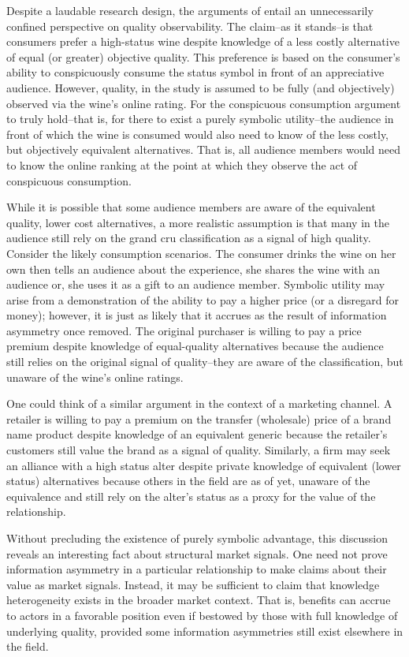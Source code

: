 Despite a laudable research design, the arguments of \citet{malter2014} entail an unnecessarily confined perspective on quality observability. The claim--as it stands--is that consumers prefer a high-status wine despite knowledge of a less costly alternative of equal (or greater) objective quality. This preference is based on the consumer's ability to conspicuously consume the status symbol in front of an appreciative audience. However, quality, in the \citet{malter2014} study is assumed to be fully (and objectively) observed via the wine's online rating. For the conspicuous consumption argument to truly hold--that is, for there to exist a purely symbolic utility--the audience in front of which the wine is consumed would also need to know of the less costly, but objectively equivalent alternatives. That is, all audience members would need to know the online ranking at the point at which they observe the act of conspicuous consumption.

While it is possible that some audience members are aware of the equivalent quality, lower cost alternatives, a more realistic assumption is that many in the audience still rely on the grand cru classification as a signal of high quality. Consider the likely consumption scenarios. The consumer drinks the wine on her own then tells an audience about the experience, she shares the wine with an audience or, she uses it as a gift to an audience member. Symbolic utility may arise from a demonstration of the ability to pay a higher price (or a disregard for money); however, it is just as likely that it accrues as the result of information asymmetry once removed. The original purchaser is willing to pay a price premium despite knowledge of equal-quality alternatives because the audience still relies on the original signal of quality--they are aware of the classification, but unaware of the wine's online ratings. 

One could think of a similar argument in the context of a marketing channel. A retailer is willing to pay a premium on the transfer (wholesale) price of a brand name product despite knowledge of an equivalent generic because the retailer's customers still value the brand as a signal of quality. Similarly, a firm may seek an alliance with a high status alter despite private knowledge of equivalent (lower status) alternatives because others in the field are as of yet, unaware of the equivalence and still rely on the alter's status as a proxy for the value of the relationship.  

Without precluding the existence of purely symbolic advantage, this discussion reveals an interesting fact about structural market signals. One need not prove information asymmetry in a particular relationship to make claims about their value as market signals. Instead, it may be sufficient to claim that knowledge heterogeneity exists in the broader market context. That is, benefits can accrue to actors in a favorable position even if bestowed by those with full knowledge of underlying quality, provided some information asymmetries still exist elsewhere in the field. 

